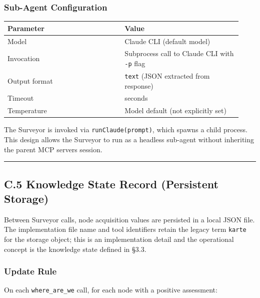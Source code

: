 \documentclass[
]{article}
\newcounter{none} %
\begin{document}
\subsubsection{Sub-Agent Configuration}\label{sub-agent-configuration}

{\def\LTcaptype{none} %
\begin{longtable}[]{@{}>{\raggedright\arraybackslash}p{0.465\linewidth}>{\raggedright\arraybackslash}p{0.465\linewidth}@{}}
\toprule\noalign{}
Parameter & Value \\
\midrule\noalign{}
\endhead
\bottomrule\noalign{}
\endlastfoot
Model & Claude CLI (default model) \\
Invocation & Subprocess call to Claude CLI with \texttt{-p} flag \\
Output format & \texttt{text} (JSON extracted from response) \\
Timeout & 120 seconds \\
Temperature & Model default (not explicitly set) \\
\end{longtable}
}

The Surveyor is invoked via \texttt{runClaude(prompt)}, which spawns a child process. This design allows the Surveyor to run as a headless sub-agent without inheriting the parent MCP server\textquotesingle s session.

\begin{center}\rule{0.5\linewidth}{0.5pt}\end{center}

\subsection{C.5 Knowledge State Record (Persistent Storage)}\label{c5-knowledge-state-record-persistent-storage}

Between Surveyor calls, node acquisition values are persisted in a local JSON file. The implementation file name and tool identifiers retain the legacy term \texttt{karte} for the storage object; this is an implementation detail and the operational concept is the knowledge state defined in §3.3.

\subsubsection{Update Rule}\label{update-rule}

On each \texttt{where\_are\_we} call, for each node with a positive assessment:
\end{document}
